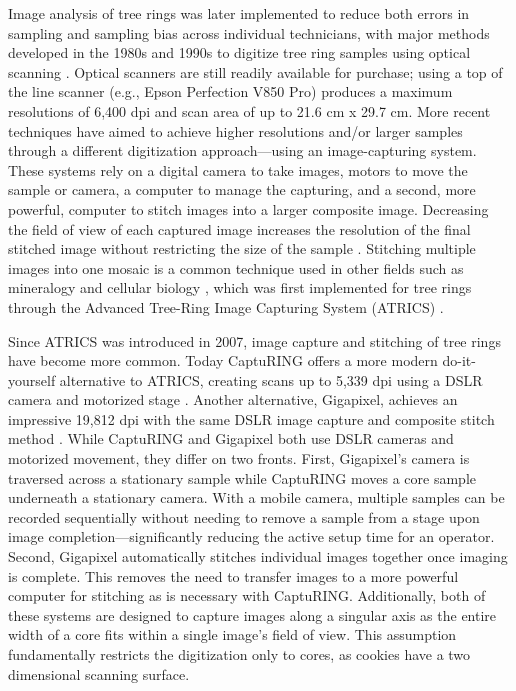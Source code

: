 \documentclass[a4paper,12pt]{article}
\begin{document}
Image analysis of tree rings was later implemented to reduce both errors in sampling and sampling bias across individual technicians, with major methods developed in the 1980s and 1990s to digitize tree ring samples using optical scanning \citep{mcmillin_application_1982,guay_new_1992}. Optical scanners are still readily available for purchase; using a top of the line scanner (e.g., Epson Perfection V850 Pro) produces a maximum resolutions of 6,400 dpi and scan area of up to 21.6 cm x 29.7 cm.
More recent techniques have aimed to achieve higher resolutions and/or larger samples through a different digitization approach---using an image-capturing system. These systems rely on a digital camera to take images, motors to move the sample or camera, a computer to manage the capturing, and a second, more powerful, computer to stitch images into a larger composite image.
Decreasing the field of view of each captured image increases the resolution of the final stitched image without restricting the size of the sample \citep{muhlich_stitching_2022}.
Stitching multiple images into one mosaic is a common technique used in other fields such as mineralogy and cellular biology \citep{ro_image_2021}, which was
first implemented for tree rings through the Advanced Tree-Ring Image Capturing System (ATRICS) \citep{levanic_atrics_2007}. %


Since ATRICS was introduced in 2007, image capture and stitching of tree rings have become more common. Today CaptuRING offers a more modern do-it-yourself alternative to ATRICS, creating scans up to 5,339 dpi using a DSLR camera and motorized stage \citep{garcia-hidalgo_capturing_2022}. 
Another alternative, Gigapixel, achieves an impressive 19,812 dpi with the same DSLR image capture and composite stitch method \citep{griffin_gigapixel_2021}. 
While CaptuRING and Gigapixel both use DSLR cameras and motorized movement, they differ on two fronts. 
First, Gigapixel's camera is traversed across a stationary sample while CaptuRING moves a core sample underneath a stationary camera.
With a mobile camera, multiple samples can be recorded sequentially without needing to remove a sample from a stage upon image completion---significantly reducing the active setup time for an operator. 
Second, Gigapixel automatically stitches individual images together once imaging is complete. This removes the need to transfer images to a more powerful computer for stitching as is necessary with CaptuRING.
Additionally, both of these systems are designed to capture images along a singular axis as the entire width of a core fits within a single image's field of view.
This assumption fundamentally restricts the digitization only to cores, as cookies have a two dimensional scanning surface. %
\end{document}
